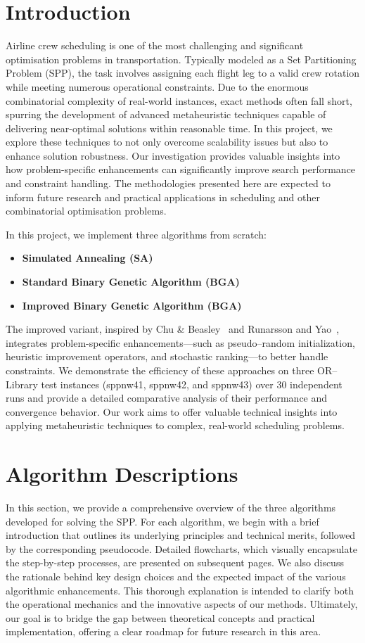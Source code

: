 \documentclass[12pt]{article}
\begin{document}
\section{Introduction}
Airline crew scheduling is one of the most challenging and significant optimisation problems in transportation. Typically modeled as a Set Partitioning Problem (SPP), the task involves assigning each flight leg to a valid crew rotation while meeting numerous operational constraints. Due to the enormous combinatorial complexity of real-world instances, exact methods often fall short, spurring the development of advanced metaheuristic techniques capable of delivering near-optimal solutions within reasonable time. In this project, we explore these techniques to not only overcome scalability issues but also to enhance solution robustness. Our investigation provides valuable insights into how problem-specific enhancements can significantly improve search performance and constraint handling. The methodologies presented here are expected to inform future research and practical applications in scheduling and other combinatorial optimisation problems.

In this project, we implement three algorithms from scratch:
\begin{itemize}
    \item \textbf{Simulated Annealing (SA)}
    \item \textbf{Standard Binary Genetic Algorithm (BGA)}
    \item \textbf{Improved Binary Genetic Algorithm (BGA)}
\end{itemize}
The improved variant, inspired by Chu \& Beasley~\cite{ChuAndBeasley1998} and Runarsson and Yao~\cite{RunarssonYao2000}, integrates problem-specific enhancements—such as pseudo–random initialization, heuristic improvement operators, and stochastic ranking—to better handle constraints. We demonstrate the efficiency of these approaches on three OR–Library test instances (sppnw41, sppnw42, and sppnw43) over 30 independent runs and provide a detailed comparative analysis of their performance and convergence behavior. Our work aims to offer valuable technical insights into applying metaheuristic techniques to complex, real-world scheduling problems.

\section{Algorithm Descriptions}
\label{sec:algorithms}
In this section, we provide a comprehensive overview of the three algorithms developed for solving the SPP. For each algorithm, we begin with a brief introduction that outlines its underlying principles and technical merits, followed by the corresponding pseudocode. Detailed flowcharts, which visually encapsulate the step-by-step processes, are presented on subsequent pages. We also discuss the rationale behind key design choices and the expected impact of the various algorithmic enhancements. This thorough explanation is intended to clarify both the operational mechanics and the innovative aspects of our methods. Ultimately, our goal is to bridge the gap between theoretical concepts and practical implementation, offering a clear roadmap for future research in this area.
\end{document}
